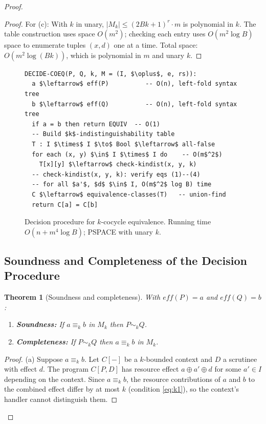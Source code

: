 \documentclass[acmsmall,sigplan,anonymous,review,screen]{acmart}
\theoremstyle{plain}
\newtheorem{theorem}{Theorem}[section]
\theoremstyle{definition}
\begin{document}
\begin{proof}
\begin{proof}
  For (c): With $k$ in unary, $|M_k| \leq (2Bk+1)^r \cdot m$ is
  polynomial in $k$.  The table construction uses space $O(m^2)$;
  checking each entry uses $O(m^2 \log B)$ space to enumerate tuples
  $(x, d)$ one at a time.  Total space: $O(m^2 \log(Bk))$, which is
  polynomial in $m$ and unary $k$.
\end{proof}

\begin{figure}[t]
\begin{lstlisting}[frame=single]
DECIDE-COEQ(P, Q, k, M = (I, $\oplus$, e, rs)):
  a $\leftarrow$ eff(P)          -- O(n), left-fold syntax tree
  b $\leftarrow$ eff(Q)          -- O(n), left-fold syntax tree
  if a = b then return EQUIV  -- O(1)
  -- Build $k$-indistinguishability table
  T : I $\times$ I $\to$ Bool $\leftarrow$ all-false
  for each (x, y) $\in$ I $\times$ I do    -- O(m$^2$)
    T[x][y] $\leftarrow$ check-kindist(x, y, k)
  -- check-kindist(x, y, k): verify eqs (1)--(4)
  -- for all $a'$, $d$ $\in$ I, O(m$^2$ log B) time
  C $\leftarrow$ equivalence-classes(T)   -- union-find
  return C[a] = C[b]
\end{lstlisting}
\caption{Decision procedure for $k$-cocycle equivalence.  Running time
  $O(n + m^4 \log B)$; PSPACE with unary $k$.}
\label{fig:decide}
\end{figure}

\subsection{Soundness and Completeness of the Decision Procedure}
\label{sec:decidability:soundcomp}

\begin{theorem}[Soundness and completeness]
\label{thm:soundcomp}
  With $\mathit{eff}(P) = a$ and $\mathit{eff}(Q) = b$:
  \begin{enumerate}[label=(\alph*),itemsep=2pt]
    \item \textbf{Soundness:} If $a \equiv_k b$ in $M_k$ then $P \sim_k Q$.
    \item \textbf{Completeness:} If $P \sim_k Q$ then $a \equiv_k b$ in $M_k$.
  \end{enumerate}
\end{theorem}

\begin{proof}
  (a) Suppose $a \equiv_k b$.  Let $C[-]$ be a $k$-bounded context and
  $D$ a scrutinee with effect $d$.  The program $C[P, D]$ has resource
  effect $a \oplus a' \oplus d$ for some $a' \in I$ depending on the
  context.  Since $a \equiv_k b$, the resource contributions of $a$ and
  $b$ to the combined effect differ by at most $k$ (condition
  \eqref{eq:k1}), so the context's handler cannot distinguish them.


\end{proof}
\end{proof}
\end{document}
